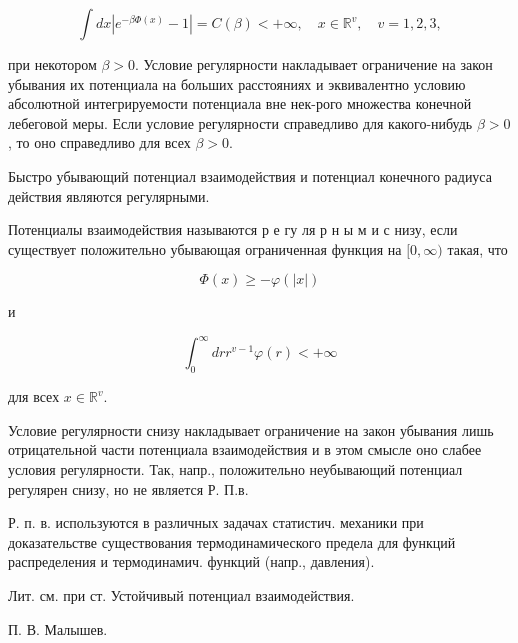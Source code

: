 \documentclass[10pt]{article}
\begin{document}
\[

\int d x\left|e^{-\beta \Phi(x)}-1\right|=C(\beta)<+\infty, \quad x \in \mathbb{R}^{v}, \quad v=1,2,3,

\]



при некотором $\beta>0$. Условие регулярности накладывает ограничение на закон убывания их потенциала на больших расстояниях и эквивалентно условию абсолютной интегрируемости потенциала вне нек-рого множества конечной лебеговой меры. Если условие регулярности справедливо для какого-нибудь $\beta>0$, то оно справедливо для всех $\beta>0$.



Быстро убывающий потенциал взаимодействия и потенциал конечного радиуса действия являются регулярными.



Потенциалы взаимодействия называются р е гу ля р н ы м и с низу, если существует положительно убывающая ограниченная функция на $[0, \infty)$ такая, что



\[

\Phi(x) \geqslant-\varphi(|x|)

\]



и



\[

\int_{0}^{\infty} d r r^{v-1} \varphi(r)<+\infty

\]



для всех $x \in \mathbb{R}^{v}$.



Условие регулярности снизу накладывает ограничение на закон убывания лишь отрицательной части потенциала взаимодействия и в этом смысле оно слабее условия регулярности. Так, напр., положительно неубывающий потенциал регулярен снизу, но не является Р. П.в.



Р. п. в. используются в различных задачах статистич. механики при доказательстве существования термодинамического предела для функций распределения и термодинамич. функций (напр., давления).



Лит. см. при ст. Устойчивый потенциал взаимодействия.



П. В. Малышев.
\end{document}

